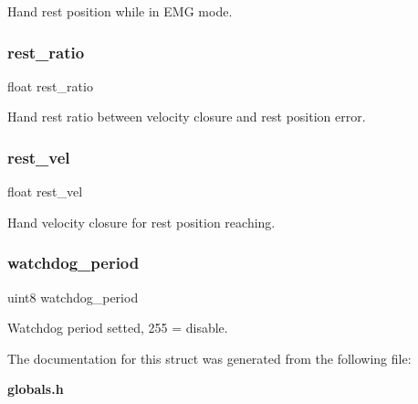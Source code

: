 Hand rest position while in E\+MG mode. \mbox{\label{structst__mem_a36ce85c7c822c5a1c014aed67f47f5e7}} 
\subsubsection{rest\+\_\+ratio}
{\footnotesize\ttfamily float rest\+\_\+ratio}

Hand rest ratio between velocity closure and rest position error. \mbox{\label{structst__mem_ac1ad7e4ba4a8bd648b4f8d9ee6105e3c}} 
\subsubsection{rest\+\_\+vel}
{\footnotesize\ttfamily float rest\+\_\+vel}

Hand velocity closure for rest position reaching. \mbox{\label{structst__mem_a1aae70aad54a04c7b41a8d2dcd7aba14}} 
\subsubsection{watchdog\+\_\+period}
{\footnotesize\ttfamily uint8 watchdog\+\_\+period}

Watchdog period setted, 255 = disable. 

The documentation for this struct was generated from the following file\+:\begin{DoxyCompactItemize}
\item 
\textbf{ globals.\+h}\end{DoxyCompactItemize}
